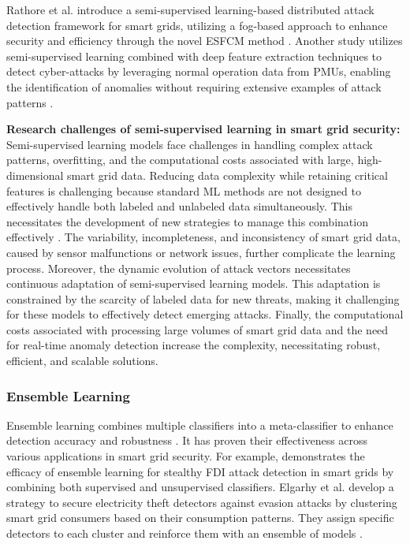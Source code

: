 \documentclass[10pt, journal]{IEEEtran}
\begin{document}
Rathore et al. introduce a semi-supervised learning-based distributed attack detection framework for smart grids, utilizing a fog-based approach to enhance security and efficiency through the novel ESFCM method \cite{rathore2018semi}. Another study utilizes semi-supervised learning combined with deep feature extraction techniques to detect cyber-attacks by leveraging normal operation data from PMUs, enabling the identification of anomalies without requiring extensive examples of attack patterns \cite{qi2020semi}.
   
   
{\bf Research challenges of semi-supervised learning in smart grid security:} Semi-supervised learning models face challenges in handling complex attack patterns, overfitting, and the computational costs associated with large, high-dimensional smart grid data. Reducing data complexity while retaining critical features is challenging because standard ML methods are not designed to effectively handle both labeled and unlabeled data simultaneously. This necessitates the development of new strategies to manage this combination effectively \cite{triguero2015self}. The variability, incompleteness, and inconsistency of smart grid data, caused by sensor malfunctions or network issues, further complicate the learning process. Moreover, the dynamic evolution of attack vectors necessitates continuous adaptation of semi-supervised learning models. This adaptation is constrained by the scarcity of labeled data for new threats, making it challenging for these models to effectively detect emerging attacks. Finally, the computational costs associated with processing large volumes of smart grid data and the need for real-time anomaly detection increase the complexity, necessitating robust, efficient, and scalable solutions.
			
\subsubsection{Ensemble Learning}

Ensemble learning combines multiple classifiers into a meta-classifier to enhance detection accuracy and robustness \cite{polikar2012ensemble}. It has proven their effectiveness across various applications in smart grid security. For example, \cite{ashrafuzzaman2020detecting} demonstrates the efficacy of ensemble learning for stealthy FDI attack detection in smart grids by combining both supervised and unsupervised classifiers. Elgarhy et al. develop a strategy to secure electricity theft detectors against evasion attacks by clustering smart grid consumers based on their consumption patterns. They assign specific detectors to each cluster and reinforce them with an ensemble of models \cite{elgarhy2023clustering}. 
\end{document}
